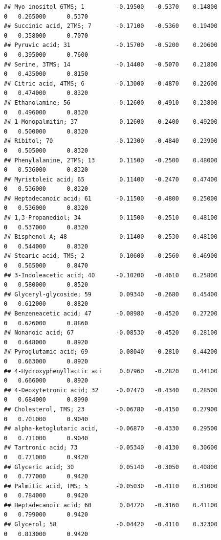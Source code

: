 \documentclass[]{article}
\begin{document}
\begin{verbatim}
## Myo inositol 6TMS; 1         -0.19500   -0.5370    0.14800         0   0.265000      0.5370
## Succinic acid, 2TMS; 7       -0.17100   -0.5360    0.19400         0   0.358000      0.7070
## Pyruvic acid; 31             -0.15700   -0.5200    0.20600         0   0.395000      0.7600
## Serine, 3TMS; 14             -0.14400   -0.5070    0.21800         0   0.435000      0.8150
## Citric acid, 4TMS; 6         -0.13000   -0.4870    0.22600         0   0.474000      0.8320
## Ethanolamine; 56             -0.12600   -0.4910    0.23800         0   0.496000      0.8320
## 1-Monopalmitin; 37            0.12600   -0.2400    0.49200         0   0.500000      0.8320
## Ribitol; 70                  -0.12300   -0.4840    0.23900         0   0.505000      0.8320
## Phenylalanine, 2TMS; 13       0.11500   -0.2500    0.48000         0   0.536000      0.8320
## Myristoleic acid; 65          0.11400   -0.2470    0.47400         0   0.536000      0.8320
## Heptadecanoic acid; 61       -0.11500   -0.4800    0.25000         0   0.536000      0.8320
## 1,3-Propanediol; 34           0.11500   -0.2510    0.48100         0   0.537000      0.8320
## Bisphenol A; 48               0.11400   -0.2530    0.48100         0   0.544000      0.8320
## Stearic acid, TMS; 2          0.10600   -0.2560    0.46900         0   0.565000      0.8470
## 3-Indoleacetic acid; 40      -0.10200   -0.4610    0.25800         0   0.580000      0.8520
## Glyceryl-glycoside; 59        0.09340   -0.2680    0.45400         0   0.612000      0.8820
## Benzeneacetic acid; 47       -0.08980   -0.4520    0.27200         0   0.626000      0.8860
## Nonanoic acid; 67            -0.08530   -0.4520    0.28100         0   0.648000      0.8920
## Pyroglutamic acid; 69         0.08040   -0.2810    0.44200         0   0.663000      0.8920
## 4-Hydroxyphenyllactic aci     0.07960   -0.2820    0.44100         0   0.666000      0.8920
## 4-Deoxytetronic acid; 32     -0.07470   -0.4340    0.28500         0   0.684000      0.8990
## Cholesterol, TMS; 23         -0.06780   -0.4150    0.27900         0   0.701000      0.9040
## alpha-ketoglutaric acid,     -0.06870   -0.4330    0.29500         0   0.711000      0.9040
## Tartronic acid; 73           -0.05340   -0.4130    0.30600         0   0.771000      0.9420
## Glyceric acid; 30             0.05140   -0.3050    0.40800         0   0.777000      0.9420
## Palmitic acid, TMS; 5        -0.05030   -0.4110    0.31000         0   0.784000      0.9420
## Heptadecanoic acid; 60        0.04720   -0.3160    0.41100         0   0.799000      0.9420
## Glycerol; 58                 -0.04420   -0.4110    0.32300         0   0.813000      0.9420

\end{verbatim}
\end{document}
